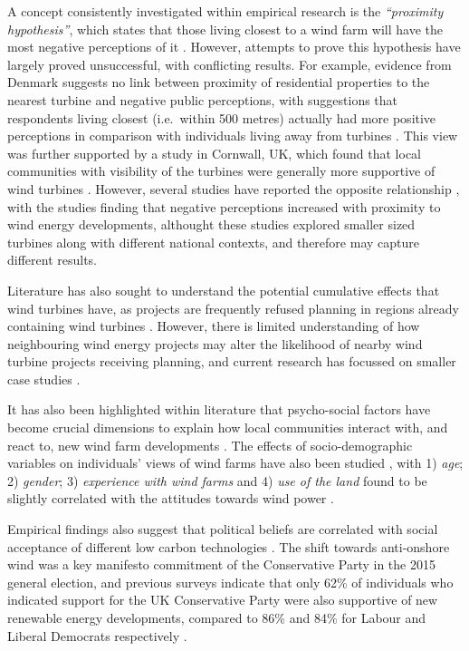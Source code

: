 \documentclass[a4paper,]{article}
\theoremstyle{definition}
\theoremstyle{definition}
\theoremstyle{definition}
\theoremstyle{remark}
\begin{document}
A concept consistently investigated within empirical research is the \emph{``proximity hypothesis''}, which states that those living closest to a wind farm will have the most negative perceptions of it \citep{Devine-Wright2005, Warren2005}. However, attempts to prove this hypothesis have largely proved unsuccessful, with conflicting results. For example, evidence from Denmark suggests no link between proximity of residential properties to the nearest turbine and negative public perceptions, with suggestions that respondents living closest (i.e.~within 500 metres) actually had more positive perceptions in comparison with individuals living away from turbines \citep{Krohn1999}. This view was further supported by a study in Cornwall, UK, which found that local communities with visibility of the turbines were generally more supportive of wind turbines \citep{Eltham2008}. However, several studies have reported the opposite relationship \citep{Meyerhoff2010, Ladenburg2008}, with the studies finding that negative perceptions increased with proximity to wind energy developments, althought these studies explored smaller sized turbines along with different national contexts, and therefore may capture different results.

Literature has also sought to understand the potential cumulative effects that wind turbines have, as projects are frequently refused planning in regions already containing wind turbines \citep{Strachan2004, Jones2011, Eltham2008}. However, there is limited understanding of how neighbouring wind energy projects may alter the likelihood of nearby wind turbine projects receiving planning, and current research has focussed on smaller case studies \citep{Jones2011}.

It has also been highlighted within literature that psycho-social factors have become crucial dimensions to explain how local communities interact with, and react to, new wind farm developments \citep{Langer2016, Scherhaufer2017}. The effects of socio-demographic variables on individuals' views of wind farms have also been studied \citep{Devine-Wright2005, Warren2010}, with 1) \emph{age}; 2) \emph{gender}; 3) \emph{experience with wind farms} and 4) \emph{use of the land} found to be slightly correlated with the attitudes towards wind power \citep{Warren2010}.

Empirical findings also suggest that political beliefs are correlated with social acceptance of different low carbon technologies \citep{Devine-Wright2007}. The shift towards anti-onshore wind was a key manifesto commitment of the Conservative Party in the 2015 general election, and previous surveys indicate that only 62\% of individuals who indicated support for the UK Conservative Party were also supportive of new renewable energy developments, compared to 86\% and 84\% for Labour and Liberal Democrats respectively \citep{Populus2005}.
\end{document}
